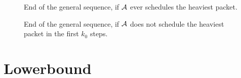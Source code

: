 \begin{figure}[ht]\centering
{}
\caption{End of the general sequence, if $\mathcal{A}$ ever schedules the heaviest packet.}
\label{img:general-end-stopping}
\end{figure}

\begin{figure}[ht]\centering
{}
\caption{End of the general sequence, if $\mathcal{A}$ does not schedule the heaviest packet in the first $k_0$ steps.}
\label{img:general-end-infinite}
\end{figure}

\section{Lowerbound}

